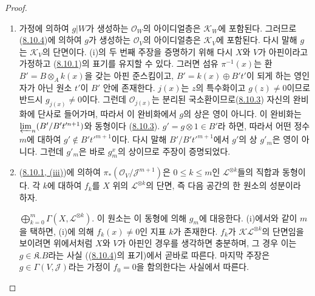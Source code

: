 \begin{proof}
\begin{enumerate}
  \item[\rm{(i)}] 가정에 의하여 $g|W$가 생성하는 $\mathcal{O}_W$의
  아이디얼층은 $\mathcal{K}_W$에 포함된다. 그러므로
  (\hyperref[II.8.10.4-ko]{8.10.4})에 의하여 $g$가 생성하는
  $\mathcal{O}_V$의 아이디얼층은 $\mathcal{K}_V$에 포함된다. 다시 말해
  $g$는 $\mathcal{K}_V$의 단면이다. (i)의 두 번째 주장을 증명하기
  위해 다시 $X$와 $V$가 아핀이라고 가정하고
  (\hyperref[II.8.10.1-ko]{8.10.1})의 표기를 유지할 수 있다. 그러면
  섬유 $\pi^{-1}(x)$는 환 $B'=B\otimes_A k(x)$을 갖는 아핀
  준스킴이고, $B'=k(x)\oplus B't'$이 되게 하는 영인자가 아닌 원소
  $t'$이 $B'$ 안에 존재한다. $j(x)$는 $z$의 특수화이고 $g(z)\neq0$이므로
  반드시 $g_{j(x)}\neq0$이다. 그런데 $\mathcal{O}_{j(x)}$는 분리된
  국소환이므로(\hyperref[II.8.10.3-ko]{8.10.3}) 자신의 완비화에
  단사로 들어가며, 따라서 이 완비화에서 $g$의 상은 영이 아니다.
  이 완비화는
  $\varprojlim_n(B'/B't'^{n+1})$와 동형이다
  (\hyperref[II.8.10.3-ko]{8.10.3}). $g'=g\otimes1\in B'$라 하면,
  따라서 어떤 정수 $m$에 대하여 $g'\notin B't'^{m+1}$이다. 다시 말해
  $B'/B't'^{m+1}$에서 $g'$의 상 $g'_m$은 영이 아니다. 그런데
  $g'_m$은 바로 $g_m^x$의 상이므로 주장이 증명되었다.
  \item[\rm{(ii)}]
  (\hyperref[II.8.10.1-ko]{8.10.1, (iii)})에 의하여
  $\pi_*(\mathcal{O}_V/\mathcal{J}^{m+1})$은
  $0\leqslant k\leqslant m$인 $\mathcal{L}^{\otimes k}$들의 직합과
  동형이다. 각 $k$에 대하여 $f_k$를 $X$ 위의
  $\mathcal{L}^{\otimes k}$의 단면, 즉 다음 공간의 한 원소의 성분이라
  하자.

  $\bigoplus_{k=0}^m\Gamma(X,\mathcal{L}^{\otimes k})$.
  이 원소는 이 동형에 의해 $g_m$에 대응한다. (i)에서와 같이 $m$을 택하면,
  (i)에 의해 $f_k(x)\neq0$인 지표 $k$가 존재한다. $f_k$가
  $\mathcal{K}\mathcal{L}^{\otimes k}$의 단면임을 보이려면 위에서처럼
  $X$와 $V$가 아핀인 경우를 생각하면 충분하며, 그 경우 이는
  $g\in\mathfrak{K}.B$라는 사실
  ((\hyperref[II.8.10.4-ko]{8.10.4})의 표기)에서 곧바로 따른다.
  마지막 주장은 $g\in\Gamma(V,\mathcal{J})$라는 가정이 $f_0=0$을
  함의한다는 사실에서 따른다.
\end{enumerate}
\end{proof}


